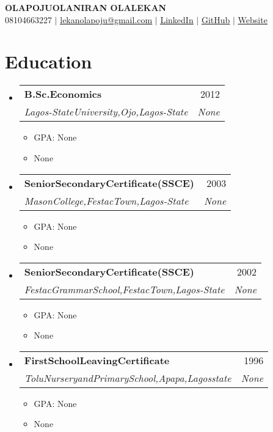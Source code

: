 \documentclass[letterpaper,11pt]{article}
\makeatletter
\newcommand{\resumeItem}[1]{
  \item\small{
    {#1 \vspace{-2pt}}
  }
}
\newcommand{\resumeSubheading}[4]{
  \vspace{-2pt}\item
    \begin{tabular*}{0.97\textwidth}[t]{l@{\extracolsep{\fill}}r}
      \textbf{#1} & #2 \\
      \textit{\small#3} & \textit{\small #4} \\
    \end{tabular*}\vspace{-7pt}
}
\newcommand{\resumeSubHeadingListStart}{\begin{itemize}[leftmargin=0.15in, label={}]}
\newcommand{\resumeSubHeadingListEnd}{\end{itemize}}
\newcommand{\resumeItemListStart}{\begin{itemize}}
\newcommand{\resumeItemListEnd}{\end{itemize}\vspace{-5pt}}
\makeatother
\begin{document}
\begin{center}
    \textbf{\Huge \scshape OLAPOJUOLANIRAN OLALEKAN} \\ \vspace{1pt}
    \small 08104663227 $|$ \href{mailto:lekanolapoju@gmail.com}{\underline{lekanolapoju@gmail.com}} $|$ \href{https://None}{\underline{LinkedIn}} $|$ \href{https://None}{\underline{GitHub}} $|$ \href{https://None}{\underline{Website}}
\end{center}

\section{Education}
  \resumeSubHeadingListStart
    \resumeSubheading
      {B.Sc.Economics}{2012}
      {Lagos-StateUniversity,Ojo,Lagos-State}{None}
      \resumeItemListStart
        \resumeItem{GPA: None}
        \resumeItem{None}
      \resumeItemListEnd
    \resumeSubheading
      {SeniorSecondaryCertificate(SSCE)}{2003}
      {MasonCollege,FestacTown,Lagos-State}{None}
      \resumeItemListStart
        \resumeItem{GPA: None}
        \resumeItem{None}
      \resumeItemListEnd
    \resumeSubheading
      {SeniorSecondaryCertificate(SSCE)}{2002}
      {FestacGrammarSchool,FestacTown,Lagos-State}{None}
      \resumeItemListStart
        \resumeItem{GPA: None}
        \resumeItem{None}
      \resumeItemListEnd
    \resumeSubheading
      {FirstSchoolLeavingCertificate}{1996}
      {ToluNurseryandPrimarySchool,Apapa,Lagosstate}{None}
      \resumeItemListStart
        \resumeItem{GPA: None}
        \resumeItem{None}
      \resumeItemListEnd
  \resumeSubHeadingListEnd

\end{document}
